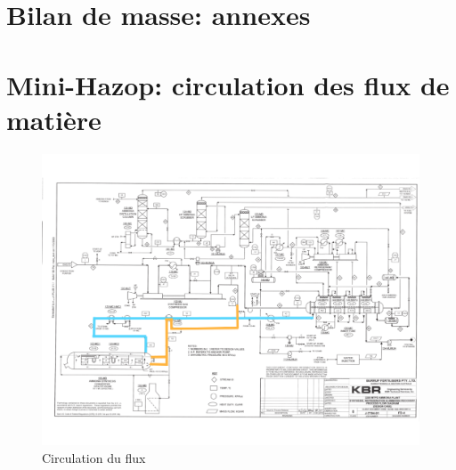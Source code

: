 \chapter{Bilan de masse: annexes}








\chapter{Mini-Hazop: circulation des flux de matière}

\label{Annexe Flux}

\begin{figure}[h]
	\begin{center}
	\includegraphics[scale=0.6]{task4/Plan1.png}
	\end{center}
	\caption{Circulation du flux}
	\label{cir1}
\end{figure}

